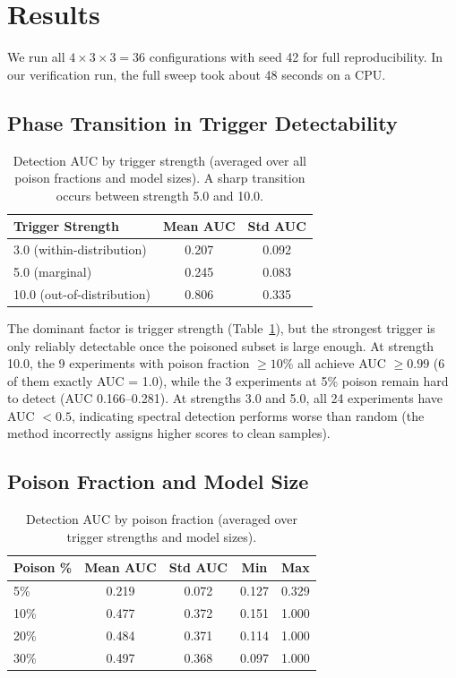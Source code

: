 \documentclass[11pt,a4paper]{article}
\begin{document}
\section{Results}

We run all $4 \times 3 \times 3 = 36$ configurations with seed 42 for full reproducibility. In our verification run, the full sweep took about 48 seconds on a CPU.

\subsection{Phase Transition in Trigger Detectability}

\begin{table}[h]
\centering
\caption{Detection AUC by trigger strength (averaged over all poison fractions and model sizes). A sharp transition occurs between strength 5.0 and 10.0.}
\label{tab:auc_trigger}
\begin{tabular}{@{}lcc@{}}
\toprule
Trigger Strength & Mean AUC & Std AUC \\
\midrule
3.0 (within-distribution) & 0.207 & 0.092 \\
5.0 (marginal) & 0.245 & 0.083 \\
10.0 (out-of-distribution) & 0.806 & 0.335 \\
\bottomrule
\end{tabular}
\end{table}

The dominant factor is trigger strength (Table~\ref{tab:auc_trigger}), but the strongest trigger is only reliably detectable once the poisoned subset is large enough. At strength 10.0, the 9 experiments with poison fraction $\geq 10\%$ all achieve AUC $\geq 0.99$ (6 of them exactly AUC = 1.0), while the 3 experiments at 5\% poison remain hard to detect (AUC 0.166--0.281). At strengths 3.0 and 5.0, all 24 experiments have AUC $< 0.5$, indicating spectral detection performs worse than random (the method incorrectly assigns higher scores to clean samples).

\subsection{Poison Fraction and Model Size}

\begin{table}[h]
\centering
\caption{Detection AUC by poison fraction (averaged over trigger strengths and model sizes).}
\label{tab:auc_poison}
\begin{tabular}{@{}lcccc@{}}
\toprule
Poison \% & Mean AUC & Std AUC & Min & Max \\
\midrule
5\% & 0.219 & 0.072 & 0.127 & 0.329 \\
10\% & 0.477 & 0.372 & 0.151 & 1.000 \\
20\% & 0.484 & 0.371 & 0.114 & 1.000 \\
30\% & 0.497 & 0.368 & 0.097 & 1.000 \\
\bottomrule
\end{tabular}
\end{table}
\end{document}

